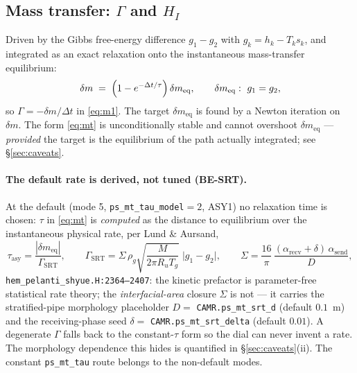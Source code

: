 \documentclass[11pt,a4paper]{article}
\newcommand{\code}[1]{\texttt{\small #1}}
\newcommand{\src}[1]{{\color{gray}\code{#1}}}
\begin{document}
\subsection{Mass transfer: $\Gamma$ and $H_{\!I}$}

Driven by the Gibbs free-energy difference $g_1-g_2$ with $g_k=h_k-T_ks_k$,
and integrated as an exact relaxation onto the instantaneous mass-transfer
equilibrium:
\begin{equation}
  \delta m \;=\; \Bigl(1-e^{-\Delta t/\tau}\Bigr)\,\delta m_{\mathrm{eq}},
  \qquad
  \delta m_{\mathrm{eq}}:\ g_1 = g_2 ,
  \label{eq:mt}
\end{equation}
so $\Gamma = -\delta m/\Delta t$ in \eqref{eq:m1}.  The target
$\delta m_{\mathrm{eq}}$ is found by a Newton iteration on $\delta m$.  The
form \eqref{eq:mt} is unconditionally stable and cannot overshoot
$\delta m_{\mathrm{eq}}$ --- \emph{provided} the target is the equilibrium of
the path actually integrated; see \S\ref{sec:caveats}.

\paragraph{The default rate is derived, not tuned (BE-SRT).}
At the default (mode 5, \code{ps\_mt\_tau\_model}$=2$, ASY1) no relaxation
time is chosen: $\tau$ in \eqref{eq:mt} is \emph{computed} as the distance
to equilibrium over the instantaneous physical rate, per Lund \& Aursand,
\begin{equation}
  \tau_{\mathrm{asy}} = \frac{|\delta m_{\mathrm{eq}}|}{\Gamma_{\!\mathrm{SRT}}},
  \qquad
  \Gamma_{\!\mathrm{SRT}}
    = \Sigma\,\rho_g\sqrt{\frac{M}{2\pi R_u T_g}}\;\bigl|g_1-g_2\bigr|,
  \qquad
  \Sigma = \frac{16}{\pi}\,
           \frac{(\alpha_{\mathrm{recv}}+\delta)\,\alpha_{\mathrm{send}}}{D},
  \label{eq:srt}
\end{equation}
\src{hem\_pelanti\_shyue.H:2364--2407}: the kinetic prefactor is
parameter-free statistical rate theory; the \emph{interfacial-area} closure
$\Sigma$ is not --- it carries the stratified-pipe morphology placeholder
$D=$ \code{CAMR.ps\_mt\_srt\_d} (default $0.1$~m) and the receiving-phase
seed $\delta=$ \code{CAMR.ps\_mt\_srt\_delta} (default $0.01$).  A
degenerate $\Gamma$ falls back to the constant-$\tau$ form so the dial can
never invent a rate.  The morphology dependence this hides is quantified in
\S\ref{sec:caveats}(ii).  The constant \code{ps\_mt\_tau} route belongs to
the non-default modes.
\end{document}

